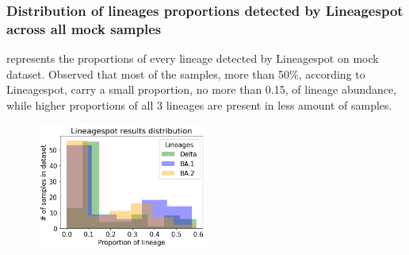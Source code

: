        \subsubsection{Distribution of lineages proportions detected by Lineagespot across all mock samples}  
         represents the proportions of every lineage detected by Lineagespot on mock dataset. Observed that most of the samples, more than 50\%, according to Lineagespot, carry a small proportion, no more than 0.15, of lineage abundance, while higher proportions of all 3 lineages are present in less amount of samples.
        \begin{figure}[H]
        	\centering
            \includegraphics[width=0.5\textwidth]{figures/further/distr-lineagespot.png}
            \label{fig:further:dist-ls}
        \end{figure}
        
\clearpage

